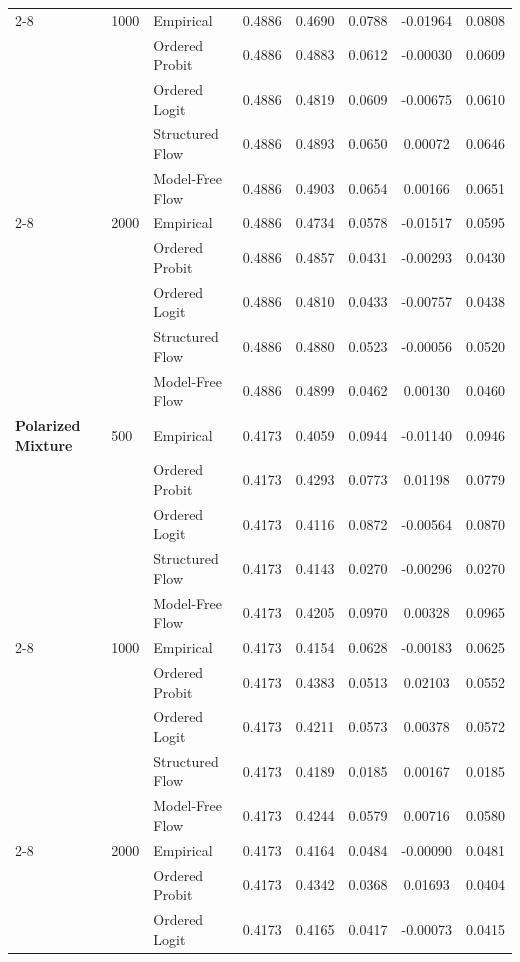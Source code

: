 \begin{table}[p]
\begin{tabular}{lllccccc}
\cline{2-8}
 & 1000 & Empirical & 0.4886 & 0.4690 & 0.0788 & -0.01964 & 0.0808 \\
 &  & Ordered Probit & 0.4886 & 0.4883 & 0.0612 & -0.00030 & 0.0609 \\
 &  & Ordered Logit & 0.4886 & 0.4819 & 0.0609 & -0.00675 & 0.0610 \\
 &  & Structured Flow & 0.4886 & 0.4893 & 0.0650 & 0.00072 & 0.0646 \\
 &  & Model-Free Flow & 0.4886 & 0.4903 & 0.0654 & 0.00166 & 0.0651 \\
\cline{2-8}
 & 2000 & Empirical & 0.4886 & 0.4734 & 0.0578 & -0.01517 & 0.0595 \\
 &  & Ordered Probit & 0.4886 & 0.4857 & 0.0431 & -0.00293 & 0.0430 \\
 &  & Ordered Logit & 0.4886 & 0.4810 & 0.0433 & -0.00757 & 0.0438 \\
 &  & Structured Flow & 0.4886 & 0.4880 & 0.0523 & -0.00056 & 0.0520 \\
 &  & Model-Free Flow & 0.4886 & 0.4899 & 0.0462 & 0.00130 & 0.0460 \\
\midrule
\textbf{Polarized Mixture} & 500 & Empirical & 0.4173 & 0.4059 & 0.0944 & -0.01140 & 0.0946 \\
 &  & Ordered Probit & 0.4173 & 0.4293 & 0.0773 & 0.01198 & 0.0779 \\
 &  & Ordered Logit & 0.4173 & 0.4116 & 0.0872 & -0.00564 & 0.0870 \\
 &  & Structured Flow & 0.4173 & 0.4143 & 0.0270 & -0.00296 & 0.0270 \\
 &  & Model-Free Flow & 0.4173 & 0.4205 & 0.0970 & 0.00328 & 0.0965 \\
\cline{2-8}
 & 1000 & Empirical & 0.4173 & 0.4154 & 0.0628 & -0.00183 & 0.0625 \\
 &  & Ordered Probit & 0.4173 & 0.4383 & 0.0513 & 0.02103 & 0.0552 \\
 &  & Ordered Logit & 0.4173 & 0.4211 & 0.0573 & 0.00378 & 0.0572 \\
 &  & Structured Flow & 0.4173 & 0.4189 & 0.0185 & 0.00167 & 0.0185 \\
 &  & Model-Free Flow & 0.4173 & 0.4244 & 0.0579 & 0.00716 & 0.0580 \\
\cline{2-8}
 & 2000 & Empirical & 0.4173 & 0.4164 & 0.0484 & -0.00090 & 0.0481 \\
 &  & Ordered Probit & 0.4173 & 0.4342 & 0.0368 & 0.01693 & 0.0404 \\
 &  & Ordered Logit & 0.4173 & 0.4165 & 0.0417 & -0.00073 & 0.0415 \\

\end{tabular}
\end{table}
